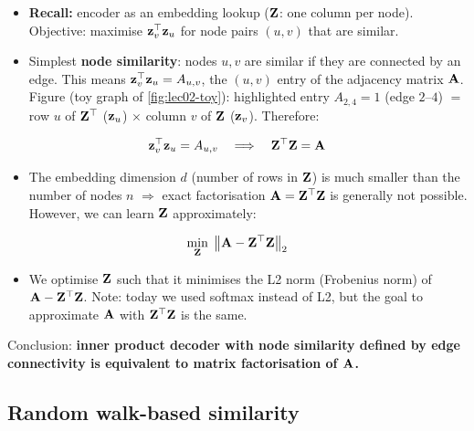 \begin{itemize}
  \item \textbf{Recall:} encoder as an embedding lookup ($\mathbf{Z}$: one column per
    node). Objective: maximise $\mathbf{z}_v^{\top}\mathbf{z}_u$ for node pairs $(u,v)$ that are
    similar.
  \item Simplest \textbf{node similarity}: nodes $u,v$ are similar if they are
    connected by an edge. This means $\mathbf{z}_v^{\top}\mathbf{z}_u=A_{u,v}$, the $(u,v)$ entry of
    the adjacency matrix $\mathbf{A}$. Figure (toy graph of \cref{fig:lec02-toy}):
    highlighted entry $A_{2,4}=1$ (edge $2$--$4$) $=$ row $u$ of $\mathbf{Z}^{\top}$
    ($\mathbf{z}_u$) $\times$ column $v$ of $\mathbf{Z}$ ($\mathbf{z}_v$). Therefore:
\end{itemize}
\begin{equation}\label{eq:lec02-ztz}
  \mathbf{z}_v^{\top}\mathbf{z}_u=A_{u,v}
  \quad\Longrightarrow\quad
  \mathbf{Z}^{\top}\mathbf{Z}=\mathbf{A}
\end{equation}
\begin{itemize}
  \item The embedding dimension $d$ (number of rows in $\mathbf{Z}$) is much smaller than
    the number of nodes $n$ $\Rightarrow$ exact factorisation $\mathbf{A}=\mathbf{Z}^{\top}\mathbf{Z}$ is
    generally not possible. However, we can learn $\mathbf{Z}$ approximately:
\end{itemize}
\begin{equation}\label{eq:lec02-mf-obj}
  \min_{\mathbf{Z}}\;\big\lVert\mathbf{A}-\mathbf{Z}^{\top}\mathbf{Z}\big\rVert_2
\end{equation}
\begin{itemize}
  \item We optimise $\mathbf{Z}$ such that it minimises the L2 norm (Frobenius norm) of
    $\mathbf{A}-\mathbf{Z}^{\top}\mathbf{Z}$. Note: today we used softmax instead of L2, but the goal to
    approximate $\mathbf{A}$ with $\mathbf{Z}^{\top}\mathbf{Z}$ is the same.
\end{itemize}
\begin{keyidea}
  Conclusion: \textbf{inner product decoder with node similarity defined by edge
  connectivity is equivalent to matrix factorisation of $\mathbf{A}$.}
\end{keyidea}

\subsection{Random walk-based similarity}\label{sec:lec02-mf-rw}


